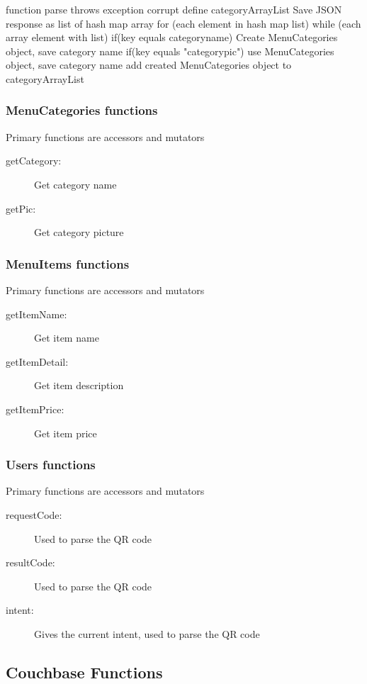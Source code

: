 \documentclass[12pt, titlepage]{article}
\begin{document}
	function parse throws exception corrupt		
		define categoryArrayList 
		Save JSON response as list of hash map array
        for (each element in hash map list) {
            while (each  array element with list) {
                if(key equals categoryname){
                    Create MenuCategories object, save category name
                }
                if(key equals "categorypic"){
                    use MenuCategories object, save category name
                }
            }
            add created MenuCategories object to categoryArrayList
        }



\subsubsection{MenuCategories functions}
Primary functions are accessors and mutators
\begin{description}
  \item[getCategory:] Get category name
  \item[getPic:] Get category picture
\end{description}

\subsubsection{MenuItems functions}
Primary functions are accessors and mutators
\begin{description}
  \item[getItemName:] Get item name
  \item[getItemDetail:] Get item description
  \item[getItemPrice:] Get item price 
\end{description}

\subsubsection{Users functions}
Primary functions are accessors and mutators
\begin{description}
  \item[requestCode:] Used to parse the QR code 
  \item[resultCode:] Used to parse the QR code 
  \item[intent:] Gives the current intent, used to parse the QR code
\end{description}

\subsection{Couchbase Functions}
\end{document}
